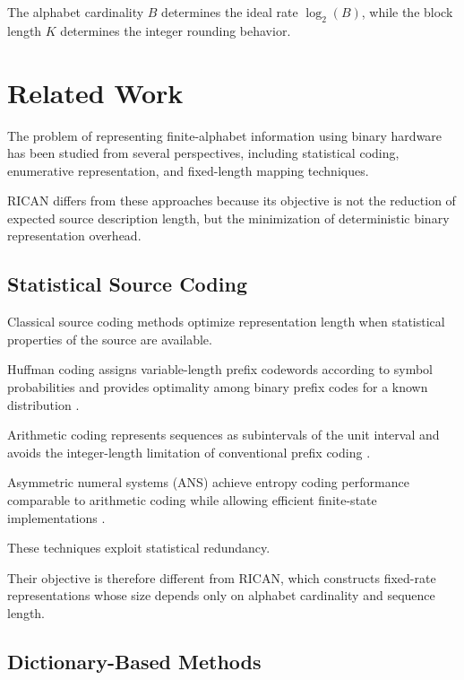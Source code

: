 \documentclass[onecolumn]{IEEEtran}
\begin{document}
The alphabet cardinality $B$ determines the ideal rate
$\log_2(B)$, while the block length $K$ determines the integer
rounding behavior.


\section{Related Work}

The problem of representing finite-alphabet information using binary
hardware has been studied from several perspectives, including
statistical coding, enumerative representation, and fixed-length
mapping techniques.

RICAN differs from these approaches because its objective is not the
reduction of expected source description length, but the minimization
of deterministic binary representation overhead.

\subsection{Statistical Source Coding}

Classical source coding methods optimize representation length when
statistical properties of the source are available.

Huffman coding assigns variable-length prefix codewords according to
symbol probabilities and provides optimality among binary prefix codes
for a known distribution \cite{huffman1952}.

Arithmetic coding represents sequences as subintervals of the unit
interval and avoids the integer-length limitation of conventional
prefix coding \cite{rissanen1979}.

Asymmetric numeral systems (ANS) achieve entropy coding performance
comparable to arithmetic coding while allowing efficient finite-state
implementations \cite{duda2013}.

These techniques exploit statistical redundancy.

Their objective is therefore different from RICAN, which constructs
fixed-rate representations whose size depends only on alphabet
cardinality and sequence length.

\subsection{Dictionary-Based Methods}
\end{document}

